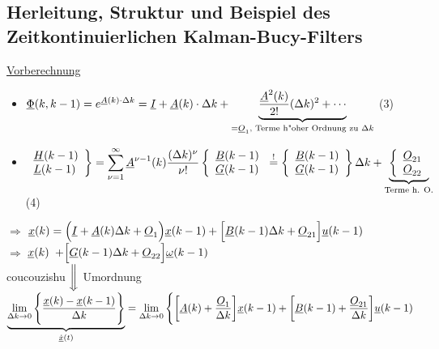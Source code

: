 \documentclass[openany,a4paper,11pt]{book}
\begin{document}
\subsection{Herleitung, Struktur und Beispiel des Zeitkontinuierlichen Kalman-Bucy-Filters}
\uline{Vorberechnung} \begin{itemize}
    \item $\displaystyle\uline{\Phi}(k,k-1)=e^{\uline{A}(k)\cdot \Delta k}=\uline{I}+\uline{A}(k)\cdot\Delta k+\underbrace{\frac{\uline{A}^2(k)}{2!}(\Delta k)^2+\cdots}_{=\uline{O}_1 \text{, Terme h"oher Ordnung zu }\Delta k}$  \quad (3)
    \item $\displaystyle\left. \begin{array}{l}
          \uline{H}(k-1) \\ \uline{L}(k-1) \\ \end{array} \right \} =\sum_{\nu=1}^{\infty} \uline{A}^{\nu-1}(k)\frac{(\Delta k)^\nu}{\nu !} \left\{ \begin{array}{l}
          \uline{B}(k-1)\\ \uline{G}(k-1) \\ \end{array} \right. \stackrel{!}{=} \left \{ \begin{array}{l}
          \uline{B}(k-1)\\ \uline{G}(k-1) \\ \end{array} \right \} \Delta k + \underbrace{\left \{ \begin{array}{l}
          \uline{O}_{21}\\ \uline{O}_{22} \\ \end{array} \right.}_{\text{Terme h. O.}} $ \quad (4)
\end{itemize}
$\Rightarrow$ \quad $\uline{x}(k)=\Big(\uline{I}+\uline{A}(k)\Delta k +\uline{O}_1\Big)\uline{x}(k-1)+\Big[\uline{B}(k-1)\Delta k+\uline{O}_{21}\Big]\uline{u}(k-1)$\\
{\color{white}$\Rightarrow$ \quad $\uline{x}(k)$} $+\Big[\uline{G}(k-1)\Delta k+\uline{O}_{22}\Big]\uline{\omega}(k-1)$\\
{\color{white} coucouzishu }$\bigg\Downarrow$ Umordnung\\
$\displaystyle\underbrace{\mathop{\text{lim}}\limits_{\Delta k\rightarrow0}\Bigg\{\frac{\uline{x}(k)-\uline{x}(k-1)}{\Delta k}\Bigg\}}_{\uline{\dot{x}}(t)}=\mathop{\text{lim}}\limits_{\Delta k\rightarrow0}\Bigg\{\bigg[\uline{A}(k)+\frac{\uline{O}_1}{\Delta k}\bigg]\uline{x}(k-1)+\bigg[\uline{B}(k-1)+\frac{\uline{O}_{21}}{\Delta k}\bigg]\uline{u}(k-1)$\\
\end{document}
